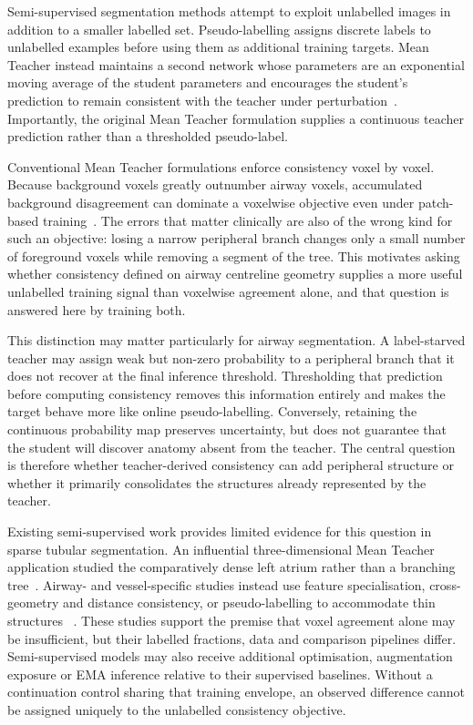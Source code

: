 Semi-supervised segmentation methods attempt to exploit unlabelled images in addition to a
smaller labelled set. Pseudo-labelling assigns discrete labels to unlabelled examples before
using them as additional training targets. Mean Teacher instead maintains a second network
whose parameters are an exponential moving average of the student parameters and encourages
the student's prediction to remain consistent with the teacher under perturbation~\cite{tarvainen2017mean}. Importantly, the original Mean Teacher formulation supplies a
continuous teacher prediction rather than a thresholded pseudo-label.

Conventional Mean Teacher formulations enforce consistency voxel by voxel. Because background
voxels greatly outnumber airway voxels, accumulated background disagreement can dominate a
voxelwise objective even under patch-based training~\cite{zheng2021gradient}. The errors that matter clinically are also of the wrong kind for
such an objective: losing a narrow peripheral branch changes only a small number of foreground voxels
while removing a segment of the tree. This motivates asking whether consistency defined on
airway centreline geometry supplies a more useful unlabelled training signal than voxelwise
agreement alone, and that question is answered here by training both.

This distinction may matter particularly for airway segmentation. A label-starved teacher may
assign weak but non-zero probability to a peripheral branch that it does not recover at the
final inference threshold. Thresholding that prediction before computing consistency removes
this information entirely and makes the target behave more like online pseudo-labelling.
Conversely, retaining the continuous probability map preserves uncertainty, but does not
guarantee that the student will discover anatomy absent from the teacher. The central question
is therefore whether teacher-derived consistency can add peripheral structure or whether it
primarily consolidates the structures already represented by the teacher.

Existing semi-supervised work provides limited evidence for this question in sparse tubular
segmentation. An influential three-dimensional Mean Teacher application studied the
comparatively dense left atrium rather than a branching tree~\cite{yu2019uamt}.
Airway- and vessel-specific studies instead use feature specialisation, cross-geometry and
distance consistency, or pseudo-labelling to accommodate thin structures
~\cite{gu2023featurespecialisation,zhu2024crossgeometry,zhao2025vesselselftraining}. These studies
support the premise that voxel agreement alone may be insufficient, but their labelled fractions,
data and comparison pipelines differ. Semi-supervised models may also receive additional
optimisation, augmentation exposure or EMA inference relative to their supervised baselines.
Without a continuation control sharing that training envelope, an observed difference cannot be
assigned uniquely to the unlabelled consistency objective.

